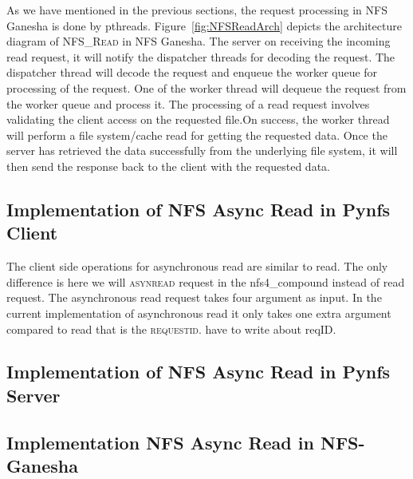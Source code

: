  As we have mentioned in the previous sections, the request processing in NFS Ganesha is done by pthreads. Figure~\ref{fig:NFSReadArch} depicts the architecture diagram of \textsc{NFS\_Read} in NFS Ganesha. The server on receiving the incoming read request, it will notify the dispatcher threads for decoding the request. The dispatcher thread will decode the request and enqueue the worker queue for processing of the request. One of the worker thread will dequeue the request from the worker queue and process it. The processing of a read request involves validating the client access on the requested file.On success, the worker thread will perform a file system/cache read for getting the requested data. Once the server has retrieved the data successfully from the underlying file system, it will then send the response back to the client with the requested data.
 
\subsection{Implementation of NFS Async Read in Pynfs Client}
 
  The client side operations for asynchronous read are similar to read. The only difference is here we will \textsc{asynread} request in the nfs4\_compound instead of read request. The asynchronous read request takes four argument as input. In the current implementation of asynchronous read it only takes one extra argument compared to read that is the \textsc{requestid}. have to write about reqID.
  
\subsection{Implementation of NFS Async Read in Pynfs Server}
  
\subsection{Implementation NFS Async Read in NFS-Ganesha}  

